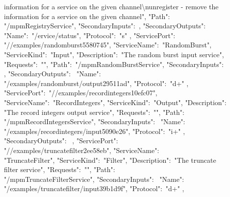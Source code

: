 information for a service on the given channel\textbackslash{}nunregister - remove the\\
information for a service on the given channel", "Path":\ \\
"\textellipsis/mpmRegistryService", "SecondaryInputs":\ \sqPair, "SecondaryOutputs":\
\openSq{} \textbraceleft\\
"Name":\ "/\textdollar{}ervice/status", "Protocol":\ "s" \textbraceright{} \closeSq{}
\textbraceright, \textbraceleft{} "ServicePort":\ \\
"/\serviceName/examples/randomburst\textunderscore{}5580745", "ServiceName":\ 
"RandomBurst",\\
"ServiceKind":\ "Input", "Description":\ "The random burst input service",\\
"Requests":\ "", "Path":\ "\textellipsis/mpmRandomBurstService",
"SecondaryInputs":\ \\
\sqPair, "SecondaryOutputs":\ \openSq{} \textbraceleft{} "Name":\ \\
"/examples/randomburst/output\textunderscore{}29511ad", "Protocol":\ "d+"
\textbraceright{} \closeSq{} \textbraceright, \textbraceleft\\
"ServicePort":\ "/\serviceName/examples/recordintegers\textunderscore{}10efc07",\\
"ServiceName":\ "RecordIntegers", "ServiceKind":\ "Output", "Description":\ \\
"The record integers output service", "Requests":\ "", "Path":\ \\
"\textellipsis/mpmRecordIntegersService", "SecondaryInputs":\ \openSq{}
\textbraceleft{} "Name":\ \\
"/examples/recordintegers/input\textunderscore{}5090e26", "Protocol":\ "i+"
\textbraceright{} \closeSq,\\
"SecondaryOutputs":\ \sqPair{} \textbraceright, \textbraceleft{} "ServicePort":\ \\
"/\serviceName/examples/truncatefilter\textunderscore{}2ee58eb", "ServiceName":\ \\
"TruncateFilter", "ServiceKind":\ "Filter", "Description":\ "The truncate\\
filter service", "Requests":\ "", "Path":\ \\
"\textellipsis/mpmTruncateFilterService", "SecondaryInputs":\ \openSq{}
\textbraceleft{} "Name":\ \\
"/examples/truncatefilter/input\textunderscore{}39b1d9f", "Protocol":\ "d+"
\textbraceright{} \closeSq,\\
